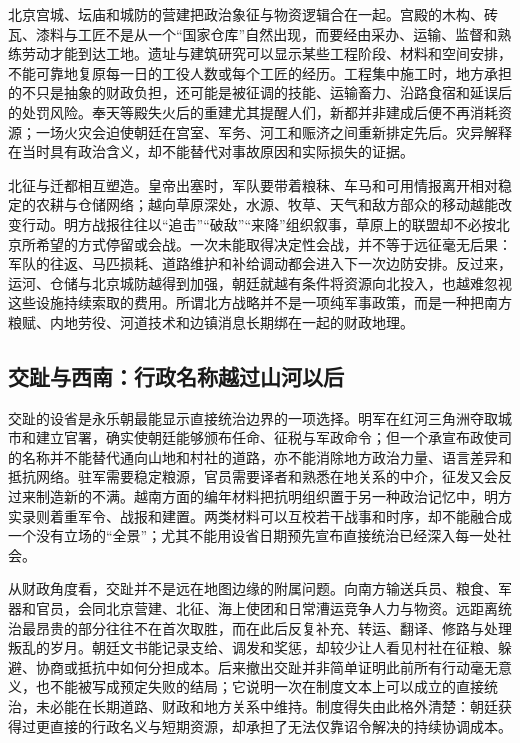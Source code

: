 北京宫城、坛庙和城防的营建把政治象征与物资逻辑合在一起。宫殿的木构、砖瓦、漆料与工匠不是从一个“国家仓库”自然出现，而要经由采办、运输、监督和熟练劳动才能到达工地。遗址与建筑研究可以显示某些工程阶段、材料和空间安排，不能可靠地复原每一日的工役人数或每个工匠的经历。工程集中施工时，地方承担的不只是抽象的财政负担，还可能是被征调的技能、运输畜力、沿路食宿和延误后的处罚风险。奉天等殿失火后的重建尤其提醒人们，新都并非建成后便不再消耗资源；一场火灾会迫使朝廷在宫室、军务、河工和赈济之间重新排定先后。灾异解释在当时具有政治含义，却不能替代对事故原因和实际损失的证据。

北征与迁都相互塑造。皇帝出塞时，军队要带着粮秣、车马和可用情报离开相对稳定的农耕与仓储网络；越向草原深处，水源、牧草、天气和敌方部众的移动越能改变行动。明方战报往往以“追击”“破敌”“来降”组织叙事，草原上的联盟却不必按北京所希望的方式停留或会战。一次未能取得决定性会战，并不等于远征毫无后果：军队的往返、马匹损耗、道路维护和补给调动都会进入下一次边防安排。反过来，运河、仓储与北京城防越得到加强，朝廷就越有条件将资源向北投入，也越难忽视这些设施持续索取的费用。所谓北方战略并不是一项纯军事政策，而是一种把南方粮赋、内地劳役、河道技术和边镇消息长期绑在一起的财政地理。

\subsection{交趾与西南：行政名称越过山河以后}

交趾的设省是永乐朝最能显示直接统治边界的一项选择。明军在红河三角洲夺取城市和建立官署，确实使朝廷能够颁布任命、征税与军政命令；但一个承宣布政使司的名称并不能替代通向山地和村社的道路，亦不能消除地方政治力量、语言差异和抵抗网络。驻军需要稳定粮源，官员需要译者和熟悉在地关系的中介，征发又会反过来制造新的不满。越南方面的编年材料把抗明组织置于另一种政治记忆中，明方实录则着重军令、战报和建置。两类材料可以互校若干战事和时序，却不能融合成一个没有立场的“全景”；尤其不能用设省日期预先宣布直接统治已经深入每一处社会。

从财政角度看，交趾并不是远在地图边缘的附属问题。向南方输送兵员、粮食、军器和官员，会同北京营建、北征、海上使团和日常漕运竞争人力与物资。远距离统治最昂贵的部分往往不在首次取胜，而在此后反复补充、转运、翻译、修路与处理叛乱的岁月。朝廷文书能记录支给、调发和奖惩，却较少让人看见村社在征粮、躲避、协商或抵抗中如何分担成本。后来撤出交趾并非简单证明此前所有行动毫无意义，也不能被写成预定失败的结局；它说明一次在制度文本上可以成立的直接统治，未必能在长期道路、财政和地方关系中维持。制度得失由此格外清楚：朝廷获得过更直接的行政名义与短期资源，却承担了无法仅靠诏令解决的持续协调成本。

